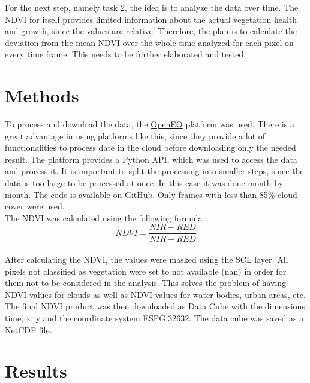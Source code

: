 \documentclass{article}
\begin{document}
For the next step, namely task 2, the idea is to analyze the data over time. The NDVI for itself provides limited information
about the actual vegetation health and growth, since the values are relative. Therefore, the plan is to calculate the 
deviation from the mean NDVI over the whole time analyzed for each pixel on every time frame. This needs to be further
elaborated and tested.\\

\section*{Methods}

To process and download the data, the \href{https://openeo.dataspace.copernicus.eu/}{OpenEO} platform was used. 
There is a great advantage in using platforms like this, since they provide a lot of functionalities to process date in the cloud
before downloading only the needed result. The platform provides a Python API, which was used to access the data and process it.
It is important to split the processing into smaller steps, since the data is too large to be processed at once.
In this case it was done month by month.
The code is available on \href{https://github.com/juliankraft/RemoteSensing_Task01}{GitHub}. 
Only frames with less than 85\% cloud cover were used.\\

The NDVI was calculated using the following formula \autocite{ndvi_sentinelhub}:\\

\begin{equation}
    NDVI = \frac{NIR - RED}{NIR + RED}
\end{equation}\\

After calculating the NDVI, the values were masked using the SCL layer. All pixels not classified as vegetation were set to not 
available (nan) in order for them not to be considered in the analysis. This solves the problem of having NDVI values for clouds as well
as NDVI values for water bodies, urban areas, etc. The final NDVI product was then downloaded as Data Cube with the dimensions
time, x, y and the coordinate system ESPG:32632. The data cube was saved as a NetCDF file.\\

\section*{Results}
\end{document}
